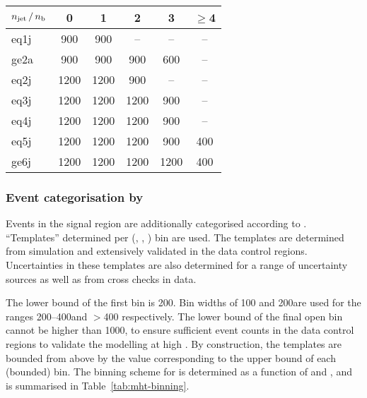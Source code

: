 \begin{table}[!h]
  \label{tab:sr-binning}
  \centering
  \begin{tabular}{ lccccc }
    \hline
    $n_{\text{jet}}\, / \,n_{\text{b}}$ & 0    & 1    & 2    & 3    & $\geq$4 \\
    \hline
    eq1j              & 900  & 900  & --   & --   & --      \\ 
    ge2a              & 900  & 900  & 900  & 600  & --      \\ 
    eq2j              & 1200 & 1200 & 900  & --   & --      \\ 
    eq3j              & 1200 & 1200 & 1200 & 900  & --      \\ 
    eq4j              & 1200 & 1200 & 1200 & 900  & --      \\ 
    eq5j              & 1200 & 1200 & 1200 & 900  & 400     \\ 
    ge6j              & 1200 & 1200 & 1200 & 1200 & 400     \\ 
    \hline
  \end{tabular}
\end{table}

\subsubsection{Event categorisation by \texorpdfstring{\HTmiss}{HTmiss}}
\label{sec:htmiss-categorisation}

Events in the signal region are additionally categorised according to
\HTmiss. ``Templates'' determined per (\njet, \scalht, \nb) bin are
used. The templates are determined from simulation and extensively
validated in the data control regions. Uncertainties in these
templates are also determined for a range of uncertainty sources as
well as from cross checks in data.

The lower bound of the first \HTmiss bin is 200\GeV. Bin widths of 100
and 200\GeV are used for the ranges 200--400\GeV and $>$400\GeV
respectively. The lower bound of the final open bin cannot be higher
than 1000\GeV, to ensure sufficient event counts in the data control
regions to validate the modelling at high \HTmiss. By construction,
the \HTmiss templates are bounded from above by the value
corresponding to the upper bound of each (bounded) \scalht bin. The
binning scheme for \HTmiss is determined as a function of \njet and
\scalht, and is summarised in Table~\ref{tab:mht-binning}.

